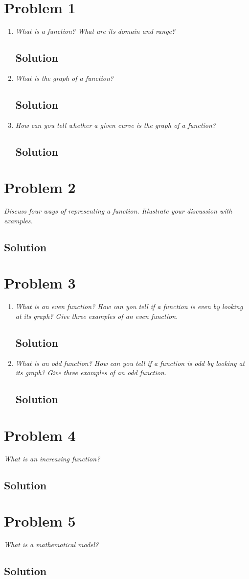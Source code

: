 \documentclass[11pt]{article}
\newcommand{\soln}{\subsection*}
\newcommand{\qn}{\textit}
\begin{document}
\section*{Problem 1}

\begin{enumerate}
	\item \qn{What is a function? What are its domain and range?}
	\soln{Solution}
	
	\item \qn{What is the graph of a function?}
	\soln{Solution}
	
	\item \qn{How can you tell whether a given curve is the graph of a function?}
	\soln{Solution}
\end{enumerate}

\section*{Problem 2}

\qn{Discuss four ways of representing a function. Illustrate your discussion with examples.}
\soln{Solution}

\section*{Problem 3}

\begin{enumerate}
	\item \qn{What is an even function? How can you tell if a function is even by looking at its graph? Give three examples of an even function.}
	\soln{Solution}
	
	\item \qn{What is an odd function? How can you tell if a function is odd by looking at its graph? Give three examples of an odd function.}
	\soln{Solution}
\end{enumerate}

\section*{Problem 4}

\qn{What is an increasing function?}
\soln{Solution}

\section*{Problem 5}

\qn{What is a mathematical model?}
\soln{Solution}
\end{document}
